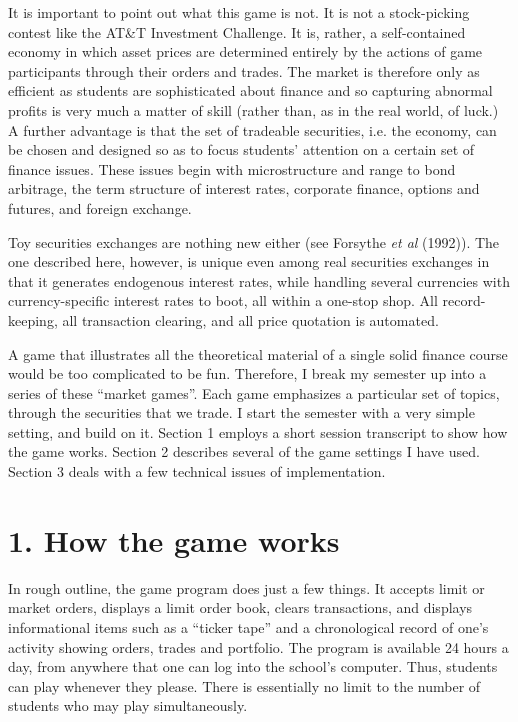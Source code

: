 It is important to point out what this game is not.  It is not a 
stock-picking contest like the AT\&T Investment Challenge.  It is, 
rather, a self-contained economy in which asset prices are determined 
entirely by the actions of game participants through their orders and 
trades.  The market is therefore only as efficient as students are 
sophisticated about finance and so capturing abnormal profits is very 
much a matter of skill (rather than, as in the real world, of luck.) 
A further advantage is that the set of tradeable securities, i.e. the 
economy, can be chosen and designed so as to focus students' attention 
on a certain set of finance issues.  These issues begin with microstructure 
and range to bond arbitrage, the term structure of interest rates, 
corporate finance, options and futures, and foreign exchange. 
 
Toy securities exchanges are nothing new either (see Forsythe {\it et al} 
(1992)). 
The one described here, however, is unique even among 
real securities exchanges in that it generates endogenous interest rates, 
while handling several currencies with currency-specific interest rates 
to boot, all within a one-stop shop.  All record-keeping, all transaction 
clearing, and all price quotation is automated. 
 
A game that illustrates all the theoretical material of a single 
solid finance course would be too complicated to be fun.  Therefore, 
I break my semester up into a series of these ``market games''.  Each 
game emphasizes a particular set of topics, through the securities 
that we trade.  I start the semester with a very simple setting, and 
build on it.  Section 1 employs a short session transcript to show 
how the game works.  Section 2 describes several of the game settings 
I have used.  Section 3 deals with a few technical issues of 
implementation. 
 
\section{1. How the game works}%
In rough outline, the game program does just a few things.  It 
accepts limit or market orders, displays a limit order book, clears 
transactions, and displays informational items such as a ``ticker 
tape'' and a chronological record of one's activity showing orders, 
trades and portfolio.  The program is available 24 hours a day, from 
anywhere that one can log into the school's computer.  Thus, students can 
play whenever they please.  There is essentially no limit to the 
number of students who may play simultaneously. 
 
